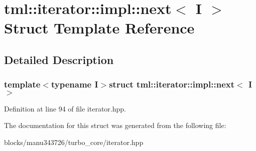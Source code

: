\hypertarget{structtml_1_1iterator_1_1impl_1_1next}{\section{tml\+:\+:iterator\+:\+:impl\+:\+:next$<$ I $>$ Struct Template Reference}
\label{structtml_1_1iterator_1_1impl_1_1next}
}


\subsection{Detailed Description}
\subsubsection*{template$<$typename I$>$struct tml\+::iterator\+::impl\+::next$<$ I $>$}



Definition at line 94 of file iterator.\+hpp.



The documentation for this struct was generated from the following file\+:\begin{DoxyCompactItemize}
\item 
blocks/manu343726/turbo\+\_\+core/iterator.\+hpp\end{DoxyCompactItemize}
